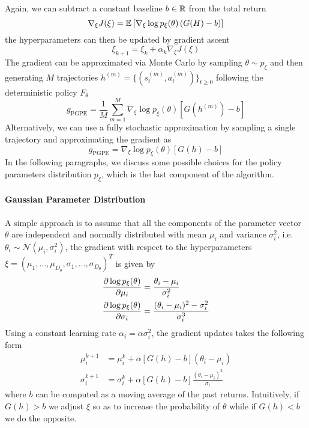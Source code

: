 Again, we can subtract a constant baseline $b \in \mathbb{R}$ from the total return 
\begin{equation}
	\nabla_\xi J(\xi) = \mathbb{E}_{}\left[ \nabla_\xi \log p_\xi(\theta)\left(G(H) - b\right) \right]
\end{equation}
the hyperparameters can then be updated by gradient ascent
\begin{equation}
	\xi_{k+1} = \xi_k + \alpha_k \nabla_\xi J(\xi)
\end{equation}
The gradient can be approximated via Monte Carlo by sampling $\theta \sim
p_\xi$ and then generating $M$ trajectories $h^{(m)} = \{(s_t^{(m)},
a_t^{(m)})\}_{t \geq 0}$ following the deterministic policy $F_\theta$ 
\begin{equation}
	g_{\text{PGPE}} = \frac{1}{M} \sum^{M}_{m=1} \nabla_\xi \log p_\xi(\theta) 
	\left[G\left(h^{(m)}\right)-b\right] 
\end{equation}
Alternatively, we can use a fully stochastic approximation by sampling a single
trajectory and approximating the gradient as 
\begin{equation}
	g_{\text{PGPE}} = \nabla_\xi \log p_\xi(\theta) \left[G(h)-b\right] 
\end{equation}
In the following paragraphs, we discuss some possible choices for the policy
parameters distribution $p_\xi$, which is the last component of the algorithm. 

\paragraph{Gaussian Parameter Distribution}
A simple approach is to assume that all the components of the parameter vector
$\theta$ are independent and normally distributed with mean $\mu_i$ and
variance $\sigma_i^2$, i.e. $\theta_i \sim \mathcal{N}(\mu_i, \sigma_i^2)$, the
gradient with respect to the hyperparameters $\xi = (\mu_1, \ldots, 
\mu_{D_\theta}, \sigma_1, \ldots, \sigma_{D_\theta})^T$ is given by 
\begin{equation}
	\begin{split}
		\frac{\partial \log p_\xi(\theta)}{\partial \mu_i} &= \frac{\theta_i -
		\mu_i}{\sigma_i^2}\\	
		\frac{\partial \log p_\xi(\theta)}{\partial \sigma_i} &= \frac{(\theta_i - \mu_i)^2 -
		\sigma_i^2}{\sigma_i^3}
	\end{split}
\end{equation}
Using a constant learning rate $\alpha_i = \alpha \sigma_i^2$, the gradient
updates takes the following form
\begin{equation}
	\begin{split}
		\mu_i^{k+1} &= \mu_i^k + \alpha \left[G(h) - b\right] (\theta_i - \mu_i)\\
		\sigma_i^{k+1} &= \sigma_i^k + \alpha \left[G(h) - b\right] 
		\frac{(\theta_i -\mu_i)^2}{\sigma_i}
	\end{split}
\end{equation}
where $b$ can be computed as a moving average of the past returns. Intuitively,
if $G(h) > b$ we adjust $\xi$ so as to increase the probability of $\theta$
while if $G(h) < b$ we do the opposite. 

